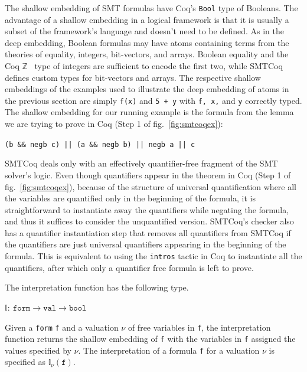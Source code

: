 \documentclass{article}
\begin{document}
	The shallow embedding of SMT formulas
	have Coq's \texttt{Bool} type of 
	Booleans. The advantage of a 
	shallow embedding in a logical 
	framework is that it is usually 
	a subset of the framework's language
	and doesn't need to be defined. 
	As in the deep embedding, Boolean
	formulas may have atoms containing 
	terms from the theories of 
	equality, integers, bit-vectors,
	and arrays. Boolean equality and
	the Coq $\mathbb{Z}$~\cite{CoqZ} type 
	of integers are sufficient to encode
	the first two, while SMTCoq 
	defines custom types for 
	bit-vectors and arrays. The
	respective shallow embeddings of
	the examples used to illustrate 
	the deep embedding of atoms in the 
	previous section are simply 
	\texttt{f(x)} and \texttt{5 + y} 
	with \texttt{f, x,} and \texttt{y}
	correctly typed. The shallow 
	embedding for our running example 
	is the formula from the lemma we 
	are trying to prove in Coq
	(Step 1 of fig.~\ref{fig:smtcoqex}):
	\begin{center}
		\texttt{(b \&\& negb c) || (a 
			\&\& negb b) || negb a || c}
	\end{center}	 
	SMTCoq deals only with an effectively 
	quantifier-free fragment of the SMT 
	solver's logic. Even though quantifiers 
	appear in the theorem in Coq (Step 1 of 
	fig.~\ref{fig:smtcoqex}), because
	of the structure of universal 
	quantification where all the variables
	are quantified only in the beginning 
	of the formula, it is straightforward
	to instantiate away the quantifiers
	while negating the formula, and thus
	it suffices to consider the 
	unquantified version. SMTCoq's 
	checker also has a quantifier 
	instantiation step that removes 
	all quantifiers from SMTCoq 
	if the quantifiers are just 
	universal quantifiers appearing
	in the beginning of the formula.
	This is equivalent to using 
	the \texttt{intros} tactic 
	in Coq to instantiate all the 
	quantifiers, after which only 
	a quantifier free formula is 
	left to prove.
	
	The interpretation function 
	has the following type.
	\begin{center}
		$\mathbb{I} :\ \texttt{form} \to 
		\texttt{val} \to \texttt{bool}$
	\end{center}
	Given a \texttt{form} \texttt{f} 
	and a valuation $\nu$ of free 
	variables in \texttt{f}, the 
	interpretation function returns 
	the shallow embedding of \texttt{f}
	with the variables in \texttt{f} 
	assigned the values specified by 
	$\nu$. The interpretation of a 
	formula \texttt{f} for a valuation 
	$\nu$ is specified as $\mathbb{I}_{\nu}
	(\texttt{f})$. 
	
\end{document}
